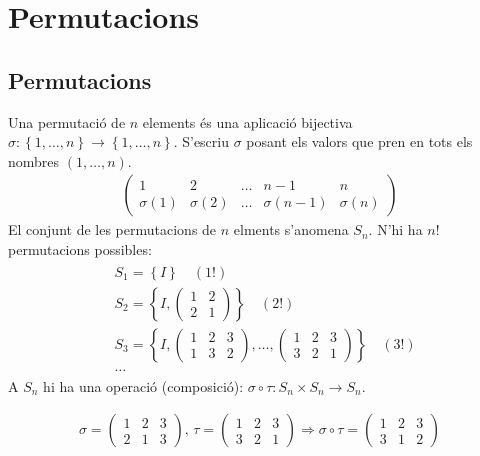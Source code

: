 \section{Permutacions}
\subsection{Permutacions}
Una permutació de $n$ elements és una aplicació bijectiva $\sigma : \left\{ 1 , \dots , n \right\} \to \left\{ 1 , \dots , n \right\}$. S'escriu $\sigma$ posant els valors que pren en tots els nombres $\left( 1 , \dots , n \right)$.
\begin{align}
    \begin{pmatrix} 1 & 2 & \dots & n-1 & n \\ \sigma (1) & \sigma (2) & \dots & \sigma (n-1) & \sigma (n) \end{pmatrix}
\end{align}
El conjunt de les permutacions de $n$ elments s'anomena $S_{n}$. N'hi ha $n!$ permutacions possibles:
\begin{align}
\begin{aligned}
    & S_{1} = \left\{ I \right\} \quad (1!) \\
    & S_{2} = \left\{ I , \begin{pmatrix} 1 & 2 \\ 2 & 1 \end{pmatrix} \right\} \quad (2!) \\
    & S_{3} = \left\{ I , \begin{pmatrix} 1 & 2 & 3 \\ 1 & 3 & 2 \end{pmatrix} , \dots , \begin{pmatrix} 1 & 2 & 3 \\ 3 & 2 & 1 \end{pmatrix} \right\} \quad (3!) \\
    & \dots
\end{aligned}
\end{align}
 A $S_{n}$ hi ha una operació (composició): $\sigma \circ \tau : S_{n} \times S_{n} \to S_{n}$.
\begin{example}
\begin{align*}
    \sigma = \begin{pmatrix} 1 & 2 & 3 \\ 2 & 1 & 3 \end{pmatrix}, \, \tau = \begin{pmatrix} 1 & 2 & 3 \\ 3 & 2 & 1 \end{pmatrix} \Rightarrow \sigma \circ \tau = \begin{pmatrix} 1 & 2 & 3 \\ 3 & 1 & 2 \end{pmatrix}
\end{align*}
\end{example}

